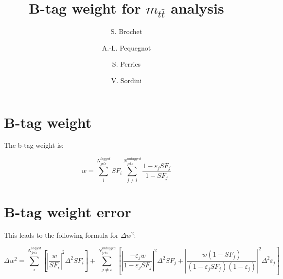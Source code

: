 \documentclass[a4paper,11pt]{article}
\title{B-tag weight for $m_{t\bar{t}}$ analysis}
\author{S. Brochet \and A.-L. Pequegnot \and S. Perries \and V. Sordini}
\begin{document}
\maketitle

\section{B-tag weight}
The b-tag weight is:

\[ w = \sum_{i}^{N_{jets}^{tagged}} SF_{i} \sum_{j\neq i}^{N_{jets}^{untagged}} \frac{1-\varepsilon _{j}SF_{j} }{1-SF_{j}} \]

\section{B-tag weight error}
This leads to the following formula for $\Delta w^{2}$:

\[ \Delta w^{2} = \sum_{i}^{N_{jets}^{tagged}} \left[ \left| \frac{w}{SF_{i}}\right|^{2} \Delta ^{2} SF_{i} \right] + \sum_{j\neq i}^{N_{jets}^{untagged}} \left[ \left| \frac{-\varepsilon _{j}w}{1-\varepsilon _{j}SF_{j}}\right|^{2}\Delta ^{2}SF_{j} +  \left|\frac{w(1-SF_{j})}{(1-\varepsilon _{j}SF_{j})(1-\varepsilon _{j})} \right|^{2}\Delta ^{2}\varepsilon _{j} \right] \]
\end{document}
